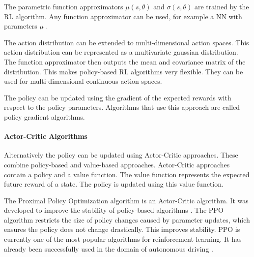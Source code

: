 The parametric function approximators $\mu(s, \theta)$ and $\sigma(s, \theta)$ are trained by the \acs{RL} algorithm. Any function approximator can be used, for example a \acs{NN} with parameters $\mu$ \textcite{rlbook2020}. 

The action distribution can be extended to multi-dimensional action spaces. This action distribution can be represented as a multivariate gaussian distribution. The function approximator then outputs the mean and covariance matrix of the distribution. This makes policy-based \acs{RL} algorithms very flexible. They can be used for multi-dimensional continuous action spaces.


The policy can be updated using the gradient of the expected rewards with respect to the policy parameters. Algorithms that use this approach are called policy gradient algorithms.


\paragraph{Actor-Critic Algorithms}
Alternatively the policy can be updated using Actor-Critic approaches. These combine policy-based and value-based approaches. Actor-Critic approaches contain a policy and a value function. The value function represents the expected future reward of a state. The policy is updated using this value function.

The Proximal Policy Optimization algorithm is an Actor-Critic algorithm. It was developed to improve the stability of policy-based algorithms \textcite{ppo}. The \acs{PPO} algorithm restricts the size of policy changes caused by parameter updates, which ensures the policy does not change drastically. This improves stability. \acs{PPO} is currently one of the most popular algorithms for reinforcement learning. It has already been successfully used in the domain of autonomous driving \textcite{maximilian}.




